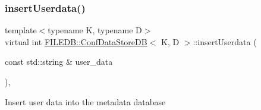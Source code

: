 \subsubsection{\texorpdfstring{insertUserdata()}{insertUserdata()}\hspace{0.1cm}{\footnotesize\ttfamily [2/3]}}
{\footnotesize\ttfamily template$<$typename K, typename D$>$ \\
virtual int \mbox{\hyperlink{classFILEDB_1_1ConfDataStoreDB}{F\+I\+L\+E\+D\+B\+::\+Conf\+Data\+Store\+DB}}$<$ K, D $>$\+::insert\+Userdata (\begin{DoxyParamCaption}\item[{const std\+::string \&}]{user\+\_\+data }\end{DoxyParamCaption})\hspace{0.3cm}{\ttfamily [inline]}, {\ttfamily [virtual]}}

Insert user data into the metadata database


